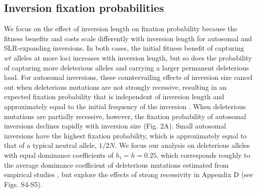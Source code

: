 \documentclass[11pt]{article}
\begin{document}


\subsection*{Inversion fixation probabilities}

We focus on the effect of inversion length on fixation probability because the fitness benefits and costs scale differently with inversion length for autosomal and SLR-expanding inversions. In both cases, the initial fitness benefit of capturing $wt$ alleles at more loci increases with inversion length, but so does the probability of capturing more deleterious alleles and carrying a larger permanent deleterious load. For autosomal inversions, these countervailing effects of inversion size cancel out when deleterious mutations are not strongly recessive, resulting in an expected fixation probability that is independent of inversion length and approximately equal to the initial frequency of the inversion \citep{ConnallonOlito2020}. When deleterious mutations are partially recessive, however, the fixation probability of autosomal inversions declines rapidly with inversion size (Fig. 2A). Small autosomal inversions have the highest fixation probability, which is approximately equal to that of a typical neutral allele, $1/2N$. We focus our analysis on deleterious alleles with equal dominance coefficients of $h_i = h = 0.25$, which corresponds roughly to the average dominance coefficient of deleterious mutations estimated from empirical studies \citep{Manna2011, AgrawalWhitlock2012}, but explore the effects of strong recessivity in Appendix D (see Figs. S4-S5).
\end{document}
